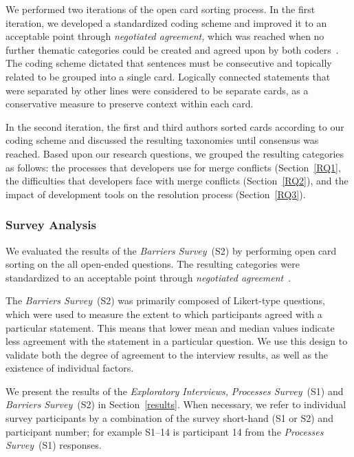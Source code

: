We performed two iterations of the open card sorting process.
In the first iteration, we developed a standardized coding scheme and improved it to an acceptable point through \textit{negotiated agreement,} which was reached when no further thematic categories could be created and agreed upon by both coders~\cite{garrison2006revisiting,ritchie2013qualitative}.
The coding scheme dictated that sentences must be consecutive and topically related to be grouped into a single card.
Logically connected statements that were separated by other lines were considered to be separate cards, as a conservative measure to preserve context within each card.

In the second iteration, the first and third authors sorted cards according to our coding scheme and discussed the resulting taxonomies until consensus was reached.
Based upon our research questions, we grouped the resulting categories as follows: the processes that developers use for merge conflicts (Section~\ref{RQ1}, the difficulties that developers face with merge conflicts (Section~\ref{RQ2}), and the impact of development tools on the resolution process (Section~\ref{RQ3}).

\subsubsection{Survey Analysis}

We evaluated the results of the \textit{Barriers Survey}~(S2) by performing open card sorting on the all open-ended questions.
The resulting categories were standardized to an acceptable point through \textit{negotiated agreement}~\cite{ritchie2013qualitative}.

The \textit{Barriers Survey}~(S2) was primarily composed of Likert-type questions, which were used to measure the extent to which participants agreed with a particular statement.
This means that lower mean and median values indicate less agreement with the statement in a particular question.
We use this design to validate both the degree of agreement to the interview results, as well as the existence of individual factors.

We present the results of the \textit{Exploratory Interviews,} \textit{Processes Survey}~(S1) and \textit{Barriers Survey}~(S2) in Section~\ref{results}.
When necessary, we refer to individual survey participants by a combination of the survey short-hand (S1 or S2) and participant number; for example S1--14 is participant 14 from the \textit{Processes Survey}~(S1) responses.

